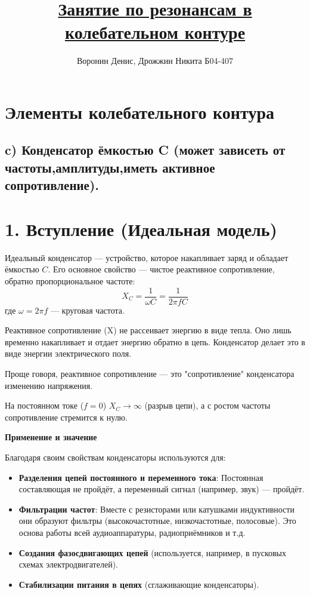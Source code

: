 \documentclass[a4paper]{article}
\title{\underline{Занятие по резонансам в колебательном контуре}}
\author{Воронин Денис, Дрожжин Никита Б04-407}
\begin{document}
\maketitle

\section{Элементы колебательного контура}
\subsection{c) Конденсатор ёмкостью C (может зависеть от частоты,амплитуды,иметь активное сопротивление).}

\section*{1. Вступление (Идеальная модель)}

Идеальный конденсатор — устройство, которое накапливает заряд и обладает ёмкостью \(C\). Его основное свойство — чистое реактивное сопротивление, обратно пропорциональное частоте:
\[
X_C = \frac{1}{\omega C} = \frac{1}{2\pi f C}
\]
где \(\omega = 2\pi f\) — круговая частота.\par
Реактивное сопротивление (X) не рассеивает энергию в виде тепла. Оно лишь временно накапливает и отдает энергию обратно в цепь. Конденсатор делает это в виде энергии электрического поля.

Проще говоря, реактивное сопротивление — это "сопротивление" конденсатора изменению напряжения.\par
На постоянном токе (\(f = 0\)) \(X_C \to \infty\) (разрыв цепи), а с ростом частоты сопротивление стремится к нулю.

\textbf{ Применение и значение}

Благодаря своим свойствам конденсаторы используются для:
\begin{itemize}
    \item \textbf{Разделения цепей постоянного и переменного тока}: Постоянная составляющая не пройдёт, а переменный сигнал (например, звук) — пройдёт.
    \item \textbf{Фильтрации частот}: Вместе с резисторами или катушками индуктивности они образуют фильтры (высокочастотные, низкочастотные, полосовые). Это основа работы всей аудиоаппаратуры, радиоприёмников и т.д.
    \item \textbf{Создания фазосдвигающих цепей} (используется, например, в пусковых схемах электродвигателей).
    \item \textbf{Стабилизации питания в цепях} (сглаживающие конденсаторы).
\end{itemize}
\end{document}
